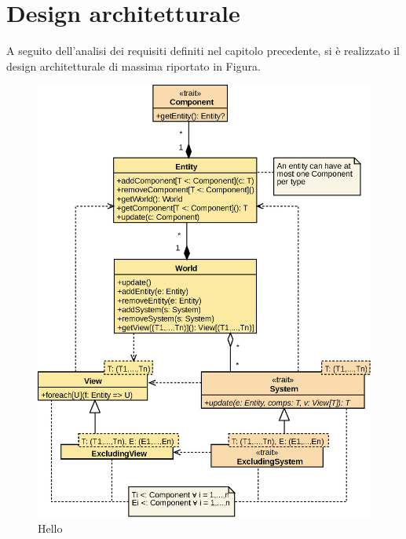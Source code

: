 \chapter{Design architetturale}\label{ch:design-architetturale}
A seguito dell'analisi dei requisiti definiti nel capitolo precedente, si è realizzato il design architetturale
di massima riportato in Figura.

\begin{figure}[H]
    \centering
    \includegraphics[width=\textwidth]{./img/Architechture}
    \caption{Hello}\label{fig:architecture}
\end{figure}

